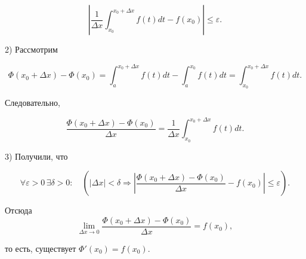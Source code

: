 {\[
\left| \frac{1}{\Delta x} \int_{x_0}^{x_0+\Delta x} f(t) dt - f(x_0) \right| \leq \varepsilon.
\]

2) Рассмотрим


\[
\Phi(x_0 + \Delta x) - \Phi(x_0) = \int_{a}^{x_0+\Delta x} f(t)dt - \int_{a}^{x_0} f(t)dt = \int_{x_0}^{x_0+\Delta x} f(t)dt.
\]

Следовательно,

\[
\frac{\Phi(x_0 + \Delta x) - \Phi(x_0)}{\Delta x} = \frac{1}{\Delta x} \int_{x_0}^{x_0+\Delta x} f(t)dt.
\]

3) Получили, что

\[
\forall \varepsilon > 0 \, \exists \delta > 0 : \quad ( |\Delta x| < \delta \Rightarrow \left| \frac{\Phi(x_0 + \Delta x) - \Phi(x_0)}{\Delta x} - f(x_0) \right| \leq \varepsilon).
\]

Отсюда
\[
\lim_{\Delta x\to 0} \frac{\Phi(x_0 + \Delta x) - \Phi(x_0)}{\Delta x} = f(x_0),
\]

то есть, существует \( \Phi'(x_0) = f(x_0) \).
}